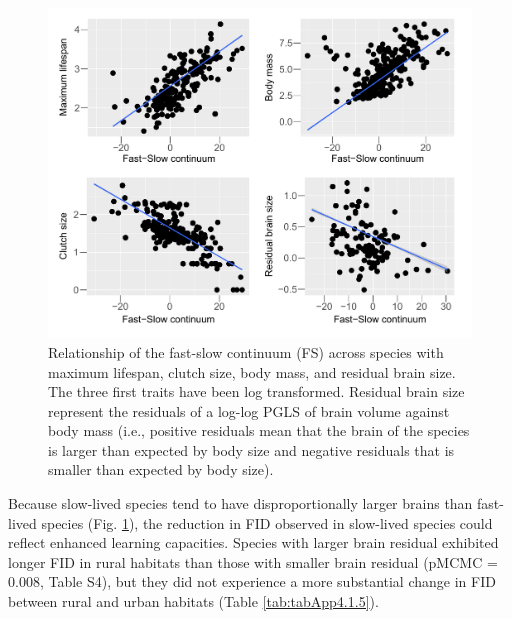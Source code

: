 \begin{figure}
\centering
\includegraphics[width=\textwidth]{./Figures/chapter04/Fig_3.png}
\caption[Fast-slow continuum and LH traits]{Relationship of the fast-slow continuum (FS) across species with maximum lifespan,
clutch size, body mass, and residual brain size. The three first
traits have been log transformed. Residual brain size represent the
residuals of a log-log PGLS of brain volume against body mass
(i.e., positive residuals mean that the brain of the species is larger
than expected by body size and negative residuals that is smaller
than expected by body size).}\label{fig:fig4.3}
\end{figure}

Because slow-lived species tend to have disproportionally
larger brains than fast-lived species (Fig. \ref{fig:fig4.3}), the reduction in
FID observed in slow-lived species could reflect enhanced learning 
capacities. Species with larger brain residual exhibited longer
FID in rural habitats than those with smaller brain residual
(pMCMC = 0.008, Table S4), but they did not experience a more
substantial change in FID between rural and urban habitats
(Table \ref{tab:tabApp4.1.5}).


